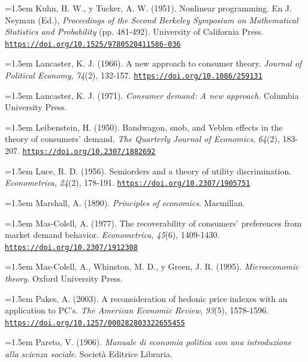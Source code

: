 \documentclass[10pt,a4paper]{article}
\begin{document}
\noindent\hangindent=1.5em Kuhn, H. W., y Tucker, A. W. (1951). Nonlinear programming. En J. Neyman (Ed.), \textit{Proceedings of the Second Berkeley Symposium on Mathematical Statistics and Probability} (pp. 481-492). University of California Press. \href{https://doi.org/10.1525/9780520411586-036}{\nolinkurl{https://doi.org/10.1525/9780520411586-036}}

\noindent\hangindent=1.5em Lancaster, K. J. (1966). A new approach to consumer theory. \textit{Journal of Political Economy}, \textit{74}(2), 132-157. \href{https://doi.org/10.1086/259131}{\nolinkurl{https://doi.org/10.1086/259131}}

\noindent\hangindent=1.5em Lancaster, K. J. (1971). \textit{Consumer demand: A new approach}. Columbia University Press.

\noindent\hangindent=1.5em Leibenstein, H. (1950). Bandwagon, snob, and Veblen effects in the theory of consumers' demand. \textit{The Quarterly Journal of Economics}, \textit{64}(2), 183-207. \href{https://doi.org/10.2307/1882692}{\nolinkurl{https://doi.org/10.2307/1882692}}

\noindent\hangindent=1.5em Luce, R. D. (1956). Semiorders and a theory of utility discrimination. \textit{Econometrica}, \textit{24}(2), 178-191. \href{https://doi.org/10.2307/1905751}{\nolinkurl{https://doi.org/10.2307/1905751}}

\noindent\hangindent=1.5em Marshall, A. (1890). \textit{Principles of economics}. Macmillan.

\noindent\hangindent=1.5em Mas-Colell, A. (1977). The recoverability of consumers' preferences from market demand behavior. \textit{Econometrica}, \textit{45}(6), 1409-1430. \href{https://doi.org/10.2307/1912308}{\nolinkurl{https://doi.org/10.2307/1912308}}

\noindent\hangindent=1.5em Mas-Colell, A., Whinston, M. D., y Green, J. R. (1995). \textit{Microeconomic theory}. Oxford University Press.

\noindent\hangindent=1.5em Pakes, A. (2003). A reconsideration of hedonic price indexes with an application to PC's. \textit{The American Economic Review}, \textit{93}(5), 1578-1596. \href{https://doi.org/10.1257/000282803322655455}{\nolinkurl{https://doi.org/10.1257/000282803322655455}}

\noindent\hangindent=1.5em Pareto, V. (1906). \textit{Manuale di economia politica con una introduzione alla scienza sociale}. Società Editrice Libraria.
\end{document}
